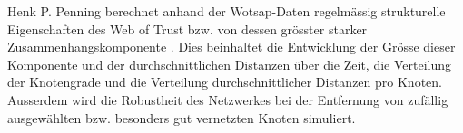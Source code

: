 Henk P. Penning berechnet anhand der Wotsap-Daten regelm\"assig
strukturelle Eigenschaften des Web of Trust bzw. von dessen gr\"osster
starker Zusammenhangskomponente \cite{Penning}. Dies beinhaltet die
Entwicklung der Gr\"osse dieser Komponente und der durchschnittlichen
Distanzen \"uber die Zeit, die Verteilung der Knotengrade und die
Verteilung durchschnittlicher Distanzen pro Knoten. Ausserdem wird die
Robustheit des Netzwerkes bei der Entfernung von zuf\"allig
ausgew\"ahlten bzw. besonders gut vernetzten Knoten simuliert.

